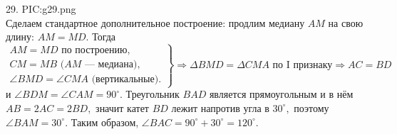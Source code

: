 29. {{PIC:g29.png}}\\
Сделаем стандартное дополнительное построение: продлим медиану $AM$ на свою длину: $AM=MD.$ Тогда $\left.\begin{array}{l}AM=MD\text{ по построению},\\
 CM=MB\text{ ($AM$ --- медиана)},\\ \angle BMD=\angle CMA\text{ (вертикальные).}\end{array}\right\}\Rightarrow
\Delta BMD=\Delta CMA\text{ по I признаку}\Rightarrow AC=BD$ и $\angle BDM=\angle CAM=90^\circ.$ Треугольник $BAD$ является прямоугольным и в нём $AB=2AC=2BD,$ значит катет $BD$ лежит напротив угла в $30^\circ,$ поэтому $\angle BAM=30^\circ.$ Таким образом, $\angle BAC=90^\circ+30^\circ=120^\circ.$\\
